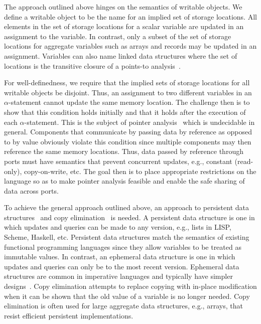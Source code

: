 The approach outlined above hinges on the semantics of writable objects.
We define a writable object to be the name for an implied set of storage locations.
All elements in the set of storage locations for a scalar variable are updated in an assignment to the variable.
In contrast, only a subset of the set of storage locations for aggregate variables such as arrays and records may be updated in an assignment.
Variables can also name linked data structures where the set of locations is the transitive closure of a points-to analysis~\cite{hind2001pointer}.

For well-definedness, we require that the implied sets of storage locations for all writable objects be disjoint.
Thus, an assignment to two different variables in an $\alpha$-statement cannot update the same memory location.
The challenge then is to show that this condition holds initially and that it holds after the execution of each $\alpha$-statement.
This is the subject of pointer analysis~\cite{hind2001pointer} which is undecidable in general.
Components that communicate by passing data by reference as opposed to by value obviously violate this condition since multiple components may then reference the same memory locations.
Thus, data passed by reference through ports must have semantics that prevent concurrent updates, e.g., constant (read-only), copy-on-write, etc.
The goal then is to place appropriate restrictions on the language so as to make pointer analysis feasible and enable the safe sharing of data across ports.

To achieve the general approach outlined above, an approach to persistent data structures~\cite{driscoll1989making} and copy elimination~\cite{gopinath1989copy} is needed.
A persistent data structure is one in which updates and queries can be made to any version, e.g., lists in LISP, Scheme, Haskell, etc.
Persistent data structures match the semantics of existing functional programming languages since they allow variables to be treated as immutable values.
In contrast, an ephemeral data structure is one in which updates and queries can only be to the most recent version.
Ephemeral data structures are common in imperative languages and typically have simpler designs~\cite{okasaki1999purely}.
Copy elimination attempts to replace copying with in-place modification when it can be shown that the old value of a variable is no longer needed.
Copy elimination is often used for large aggregate data structures, e.g., arrays, that resist efficient persistent implementations.

